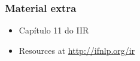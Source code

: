 \documentclass[compress]{beamer}
\begin{document}

\begin{frame}
\frametitle{Material extra}
\begin{itemize}
\item Capítulo 11 do IIR
\item Resources at
\url{http://ifnlp.org/ir}
\end{itemize}
\end{frame}
\end{document}

